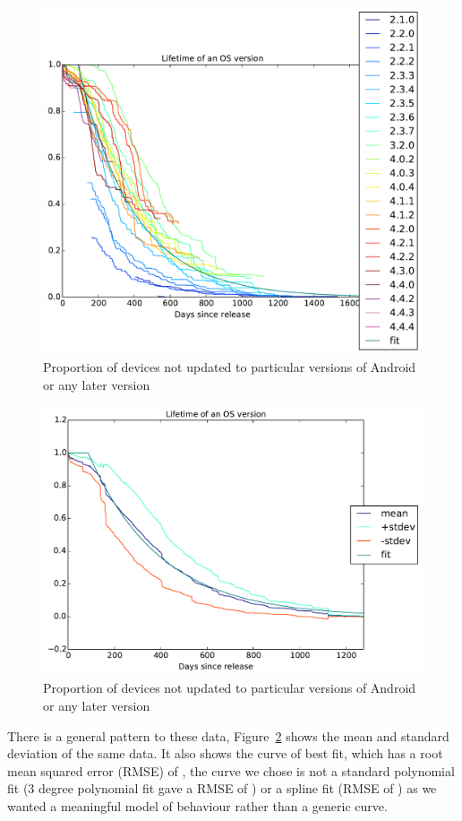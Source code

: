 \documentclass[conference,a4paper,twoside]{IEEEtran}
\begin{document}
\begin{figure}
 \includegraphics[width=\columnwidth]{figures/frvh_os_versions}
 \caption{Proportion of devices not updated to particular versions of Android or any later version}
 \label{fig:frvh_os_versions}
\end{figure}
\begin{figure}
 \includegraphics[width=\columnwidth]{figures/frms_os_versions}
 \caption{Proportion of devices not updated to particular versions of Android or any later version}
 \label{fig:frms_os_versions}
\end{figure}
There is a general pattern to these data, Figure~\ref{fig:frms_os_versions} shows the mean and standard deviation of the same data.
It also shows the curve of best fit, which has a root mean squared error (RMSE) of \daOSCurveFitRMSE, the curve we chose is not a standard polynomial fit (3 degree polynomial fit gave a RMSE of \daOSCurvePolyRMSE) or a spline fit (RMSE of \daOSCurveSplineRMSE) as we wanted a meaningful model of behaviour rather than a generic curve.
\end{document}
